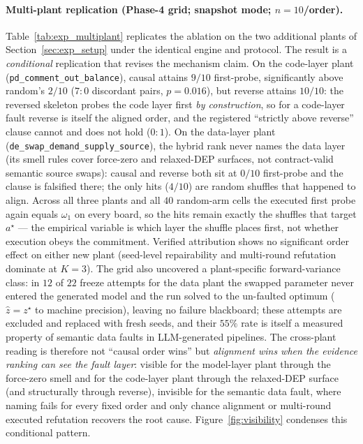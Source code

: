 \documentclass[a4paper,fleqn]{cas-sc}
\begin{document}
\paragraph{Multi-plant replication (Phase-4 grid; snapshot mode; $n{=}10$/order).}
Table~\ref{tab:exp_multiplant} replicates the ablation on the two
additional plants of Section~\ref{sec:exp_setup} under the identical
engine and protocol. The result is a \emph{conditional} replication that
revises the mechanism claim. On the code-layer plant
(\texttt{pd\_comment\_out\_balance}), causal attains $9/10$ first-probe,
significantly above random's $2/10$ ($7{:}0$ discordant pairs, $p=0.016$),
but reverse attains $10/10$: the reversed skeleton probes the code layer
first \emph{by construction}, so for a code-layer fault reverse is itself
the aligned order, and the registered ``strictly above reverse'' clause
cannot and does not hold ($0{:}1$). On the data-layer plant
(\texttt{de\_swap\_demand\_supply\_source}), the hybrid rank never names
the data layer (its smell rules cover force-zero and relaxed-DEP
surfaces, not contract-valid semantic source swaps): causal and reverse
both sit at $0/10$ first-probe and the clause is falsified there; the
only hits ($4/10$) are random shuffles that happened to align. Across all
three plants and all $40$ random-arm cells the executed first probe again
equals $\omega_1$ on every board, so the hits remain exactly the shuffles
that target $a^{\star}$ --- the empirical variable is which layer the
shuffle places first, not whether execution obeys the commitment.
Verified attribution shows no significant order
effect on either new plant (seed-level repairability and multi-round
refutation dominate at $K{=}3$). The grid also uncovered a
plant-specific forward-variance class: in $12$ of $22$ freeze attempts
for the data plant the swapped parameter never entered the generated
model and the run solved to the un-faulted optimum ($\hat z = z^{\star}$
to machine precision), leaving no failure blackboard; these attempts are
excluded and replaced with fresh seeds, and their $55\%$ rate is itself a
measured property of semantic data faults in LLM-generated pipelines.
The cross-plant reading is therefore not ``causal order wins'' but
\emph{alignment wins when the evidence ranking can see the fault layer}:
visible for the model-layer plant through the force-zero smell and for
the code-layer plant through the relaxed-DEP surface (and structurally
through reverse), invisible for the semantic data fault, where naming
fails for every fixed order and only chance alignment or multi-round
executed refutation recovers the root cause.
Figure~\ref{fig:visibility} condenses this conditional pattern.
\end{document}
